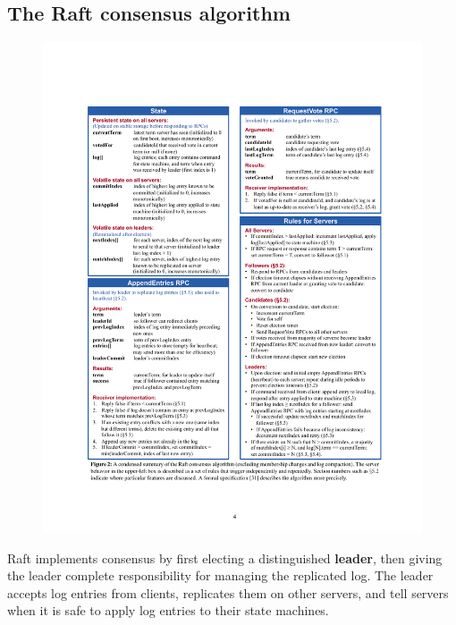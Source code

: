 \documentclass[11pt]{article}
\begin{document}
\subsection{The Raft consensus algorithm}
\label{sec:orgcc2971c}
\begin{figure}[htbp]
\centering
\includegraphics[width=.9\linewidth]{../images/6.824/3.pdf}
\label{}
\end{figure}


Raft implements consensus by first electing a distinguished \textbf{leader}, then giving the leader
complete responsibility for managing the replicated log. The leader accepts log entries from
clients, replicates them on other servers, and tell servers when it is safe to apply log entries
to their state machines.
\end{document}

